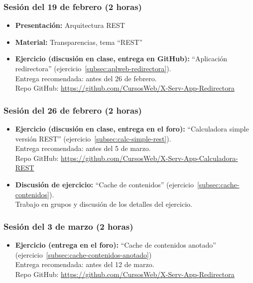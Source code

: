 \documentclass[a4paper,12pt]{article}
\begin{document}
\subsubsection{Sesión del 19 de febrero (2 horas)}

\begin{itemize}
\item \textbf{Presentación:} Arquitectura REST
\item \textbf{Material:} Transparencias, tema ``REST''
\item \textbf{Ejercicio (discusión en clase, entrega en GitHub):} ``Aplicación redirectora'' (ejercicio~\ref{subsec:aplweb-redirectora}). \\
  Entrega recomendada: antes del 26 de febrero. \\
  Repo GitHub: \url{https://github.com/CursosWeb/X-Serv-App-Redirectora}
\end{itemize}

\subsubsection{Sesión del 26 de febrero (2 horas)}

\begin{itemize}
\item \textbf{Ejercicio (discusión en clase, entrega en el foro):} ``Calculadora simple versión REST'' (ejercicio~\ref{subsec:calc-simple-rest}). \\
  Entrega recomendada: antes del 5 de marzo. \\
  Repo GitHub: \url{https://github.com/CursosWeb/X-Serv-App-Calculadora-REST}
\item \textbf{Discusión de ejercicio:} ``Cache de contenidos'' (ejercicio~\ref{subsec:cache-contenidos}). \\
  Trabajo en grupos y discusión de los detalles del ejercicio.
\end{itemize}

\subsubsection{Sesión del 3 de marzo (2 horas)}

\begin{itemize}
\item \textbf{Ejercicio (entrega en el foro):} ``Cache de contenidos anotado'' (ejercicio~\ref{subsec:cache-contenidos-anotado}) \\
  Entrega recomendada: antes del 12 de marzo. \\
  Repo GitHub: \url{https://github.com/CursosWeb/X-Serv-App-Redirectora}
\end{itemize}
\end{document}

